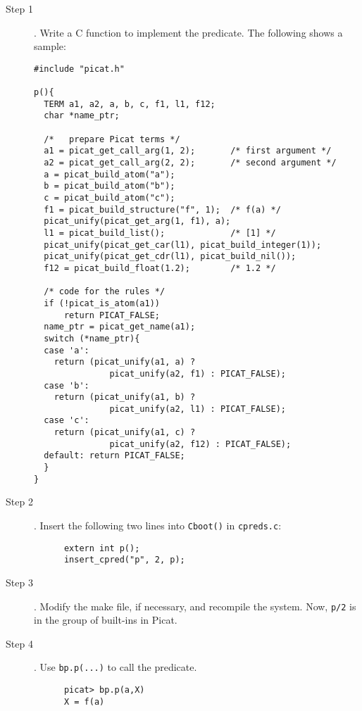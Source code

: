 \begin{description}
\item [Step 1]. Write a C function to implement the predicate. The following shows a sample:
\begin{verbatim}
#include "picat.h"

p(){
  TERM a1, a2, a, b, c, f1, l1, f12;
  char *name_ptr;
  
  /*   prepare Picat terms */
  a1 = picat_get_call_arg(1, 2);       /* first argument */
  a2 = picat_get_call_arg(2, 2);       /* second argument */
  a = picat_build_atom("a");
  b = picat_build_atom("b");
  c = picat_build_atom("c");
  f1 = picat_build_structure("f", 1);  /* f(a) */
  picat_unify(picat_get_arg(1, f1), a);
  l1 = picat_build_list();             /* [1] */ 
  picat_unify(picat_get_car(l1), picat_build_integer(1));
  picat_unify(picat_get_cdr(l1), picat_build_nil());
  f12 = picat_build_float(1.2);        /* 1.2 */
  
  /* code for the rules */
  if (!picat_is_atom(a1)) 
      return PICAT_FALSE;
  name_ptr = picat_get_name(a1);
  switch (*name_ptr){
  case 'a': 
    return (picat_unify(a1, a) ? 
               picat_unify(a2, f1) : PICAT_FALSE);
  case 'b': 
    return (picat_unify(a1, b) ? 
               picat_unify(a2, l1) : PICAT_FALSE);
  case 'c': 
    return (picat_unify(a1, c) ? 
               picat_unify(a2, f12) : PICAT_FALSE);
  default: return PICAT_FALSE;
  }
}
\end{verbatim}

\item [Step 2]. Insert the following two lines into \texttt{Cboot()} in \texttt{cpreds.c}:
\begin{verbatim}
      extern int p();
      insert_cpred("p", 2, p);
\end{verbatim}
\item [Step 3]. Modify the make file, if necessary, and recompile the system. Now, \texttt{p/2} is in the group of built-ins in Picat.

\item [Step 4]. Use \texttt{bp.p(...)} to call the predicate.
\begin{verbatim}
      picat> bp.p(a,X)
      X = f(a)
\end{verbatim}

\end{description}

